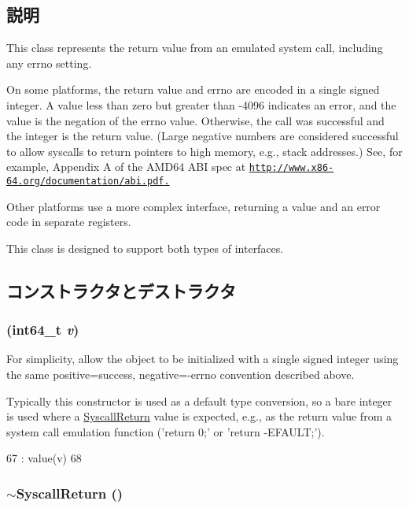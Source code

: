 \subsection{説明}
This class represents the return value from an emulated system call, including any errno setting.

On some platforms, the return value and errno are encoded in a single signed integer. A value less than zero but greater than -\/4096 indicates an error, and the value is the negation of the errno value. Otherwise, the call was successful and the integer is the return value. (Large negative numbers are considered successful to allow syscalls to return pointers to high memory, e.g., stack addresses.) See, for example, Appendix A of the AMD64 ABI spec at \href{http://www.x86-64.org/documentation/abi.pdf.}{\tt http://www.x86-\/64.org/documentation/abi.pdf.}

Other platforms use a more complex interface, returning a value and an error code in separate registers.

This class is designed to support both types of interfaces. 

\subsection{コンストラクタとデストラクタ}
\hypertarget{classSyscallReturn_a7fdded1828c9eb76cd086f4f55f38da8}{
\subsubsection[{SyscallReturn}]{ (int64\_\-t {\em v})}}
\label{classSyscallReturn_a7fdded1828c9eb76cd086f4f55f38da8}
For simplicity, allow the object to be initialized with a single signed integer using the same positive=success, negative=-\/errno convention described above.

Typically this constructor is used as a default type conversion, so a bare integer is used where a \hyperlink{classSyscallReturn}{SyscallReturn} value is expected, e.g., as the return value from a system call emulation function ('return 0;' or 'return -\/EFAULT;'). 


\begin{DoxyCode}
67         : value(v)
68     {}
\end{DoxyCode}
\hypertarget{classSyscallReturn_a997bdb2ede937063f361964236058fb0}{
\subsubsection[{$\sim$SyscallReturn}]{\setlength{\rightskip}{0pt plus 5cm}$\sim${\bf SyscallReturn} ()}}
\label{classSyscallReturn_a997bdb2ede937063f361964236058fb0}



